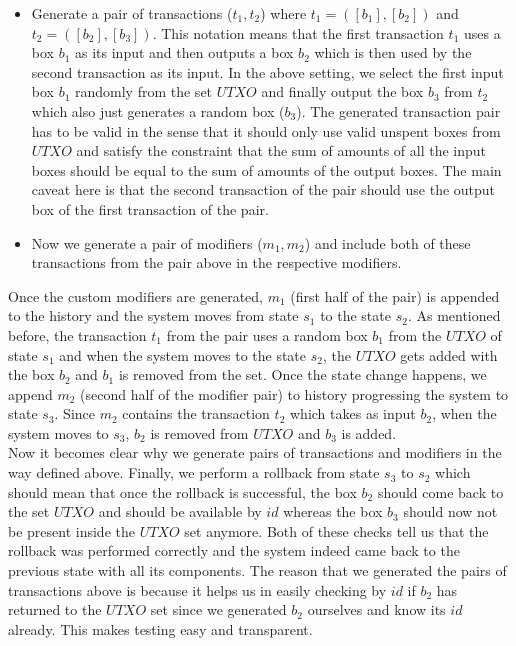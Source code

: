 \begin{enumerate}[\IEEEsetlabelwidth{Z}]
\begin{itemize}[]
\begin{itemize}
\item Generate a pair of transactions ($t_1, t_2$) where $t_1 = ([b_{1}], [b_{2}])$ and $t_2 = ([b_{2}], [b_{3}])$. This notation means that the first transaction $t_1$ uses a box $b_1$ as its input and then outputs a box $b_2$ which is then used by the second transaction as its input. In the above setting, we select the first input box $b_1$ randomly from the set $UTXO$ and finally output the box $b_3$ from $t_2$ which also just generates a random box ($b_3$). The generated transaction pair has to be valid in the sense that it should only use valid unspent boxes from $UTXO$ and satisfy the constraint that the sum of amounts of all the input boxes should be equal to the sum of amounts of the output boxes. The main caveat here is that the second transaction of the pair should use the output box of the first transaction of the pair.
\item Now we generate a pair of modifiers ($m_1, m_2$) and include both of these transactions from the pair above in the respective modifiers.
\end{itemize}

Once the custom modifiers are generated, $m_1$ (first half of the pair) is appended to the history and the system moves from state $s_1$ to the state $s_2$. As mentioned before, the transaction $t_1$ from the pair uses a random box $b_1$ from the $UTXO$ of state $s_1$ and when the system moves to the state $s_2$, the $UTXO$ gets added with the box $b_2$ and $b_1$ is removed from the set. Once the state change happens, we append $m_2$ (second half of the modifier pair) to history progressing the system to state $s_3$. Since $m_2$ contains the transaction $t_2$ which takes as input $b_2$, when the system moves to $s_3$, $b_2$ is removed from $UTXO$ and $b_3$ is added.\\

Now it becomes clear why we generate pairs of transactions and modifiers in the way defined above. Finally, we perform a rollback from state $s_3$ to $s_2$ which should mean that once the rollback is successful, the box $b_2$ should come back to the set $UTXO$ and should be available by $id$ whereas the box $b_3$ should now not be present inside the $UTXO$ set anymore. Both of these checks tell us that the rollback was performed correctly and the system indeed came back to the previous state with all its components. The reason that we generated the pairs of transactions above is because it helps us in easily checking by $id$ if $b_2$ has returned to the $UTXO$ set since we generated $b_2$ ourselves and know its $id$ already. This makes testing easy and transparent. \\


\end{itemize}
\end{enumerate}
